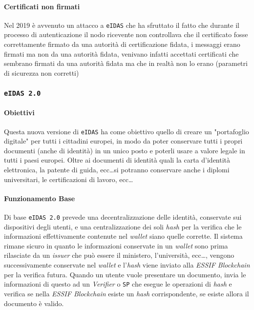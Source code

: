             \paragraph{Certificati non firmati} Nel 2019 è avvenuto un attacco a \texttt{eIDAS} che ha sfruttato il fatto che durante il processo di autenticazione il nodo ricevente non controllava che il certificato fosse correttamente firmato da una autorità di certificazione fidata, i messaggi erano firmati ma non da una autorità fidata, venivano infatti accettati certificati che sembrano firmati da una autorità fidata ma che in realtà non lo erano (parametri di sicurezza non corretti)
        \subsubsection{\texttt{eIDAS 2.0}}
            \paragraph{Obiettivi} Questa nuova versione di \texttt{eIDAS} ha come obiettivo quello di creare un "portafoglio digitale" per tutti i cittadini europei, in modo da poter conservare tutti i propri documenti (anche di identità) in un unico posto e poterli usare a valore legale in tutti i paesi europei. Oltre ai documenti di identità quali la carta d'identità elettronica, la patente di guida, ecc\dots si potranno conservare anche i diplomi universitari, le certificazioni di lavoro, ecc\dots
            \paragraph{Funzionamento Base} Di base \texttt{eIDAS 2.0} prevede una decentralizzazione delle identità, conservate sui dispositivi degli utenti, e una centralizzazione dei soli \textit{hash} per la verifica che le informazioni effettivamente contenute nel \textit{wallet} siano quelle corrette. Il sistema rimane sicuro in quanto le informazioni conservate in un \textit{wallet} sono prima rilasciate da un \textit{issuer} che può essere il ministero, l'università, ecc\dots, vengono successivamente conservate nel \textit{wallet} e l'\textit{hash} viene inviato alla \textit{ESSIF Blockchain} per la verifica futura. Quando un utente vuole presentare un documento, invia le informazioni di questo ad un \textit{Verifier} o \texttt{SP} che esegue le operazioni di \textit{hash} e verifica se nella \textit{ESSIF Blockchain} esiste un \textit{hash} corrispondente, se esiste allora il documento è valido.